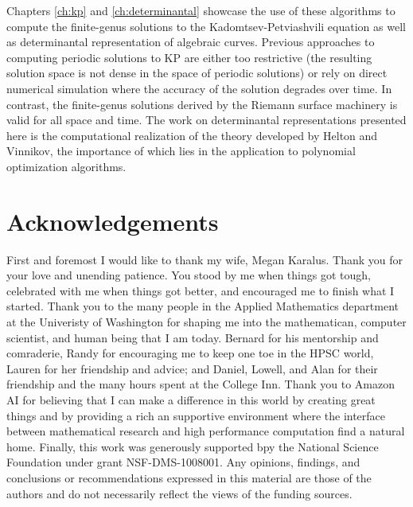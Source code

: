 Chapters \ref{ch:kp} and \ref{ch:determinantal} showcase the use of these
algorithms to compute the finite-genus solutions to the Kadomtsev-Petviashvili
equation as well as determinantal representation of algebraic curves. Previous
approaches to computing periodic solutions to KP are either too restrictive (the
resulting solution space is not dense in the space of periodic solutions) or
rely on direct numerical simulation where the accuracy of the solution degrades
over time. In contrast, the finite-genus solutions derived by the Riemann
surface machinery is valid for all space and time. The work on determinantal
representations presented here is the computational realization of the theory
developed by Helton and Vinnikov, the importance of which lies in the
application to polynomial optimization algorithms.

\section{Acknowledgements} \label{sec:acknowledgments}

First and foremost I would like to thank my wife, Megan Karalus. Thank you for
your love and unending patience. You stood by me when things got tough,
celebrated with me when things got better, and encouraged me to finish what I
started. Thank you to the many people in the Applied Mathematics department at
the Univeristy of Washington for shaping me into the mathematican, computer
scientist, and human being that I am today. Bernard for his mentorship and
comraderie, Randy for encouraging me to keep one toe in the HPSC world, Lauren
for her friendship and advice; and Daniel, Lowell, and Alan for their friendship
and the many hours spent at the College Inn. Thank you to Amazon AI for
believing that I can make a difference in this world by creating great things
and by providing a rich an supportive environment where the interface between
mathematical research and high performance computation find a natural home.
Finally, this work was generously supported bpy the National Science Foundation
under grant NSF-DMS-1008001. Any opinions, findings, and conclusions or
recommendations expressed in this material are those of the authors and do not
necessarily reflect the views of the funding sources.
